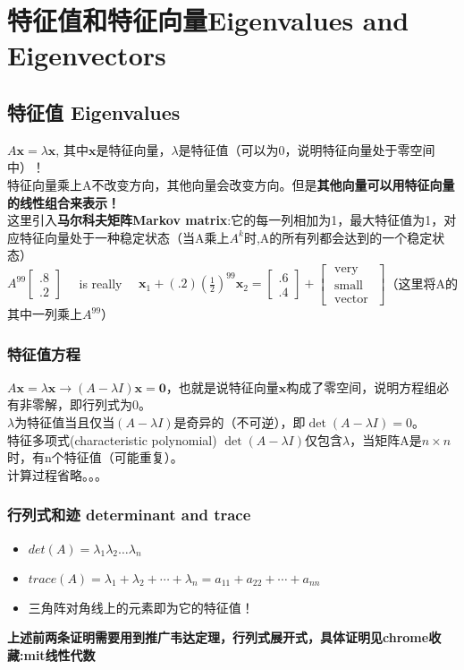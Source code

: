     \section{特征值和特征向量Eigenvalues and Eigenvectors}
    \subsection{特征值 Eigenvalues}
    $A \boldsymbol{x}=\lambda \boldsymbol{x}$, 其中$\bm{x}$是特征向量，$\lambda$是特征值（可以为0，说明特征向量处于零空间中）！
    \\
    特征向量乘上A不改变方向，其他向量会改变方向。但是\textbf{其他向量可以用特征向量的线性组合来表示！}
    \\
    这里引入\textbf{马尔科夫矩阵Markov matrix}:它的每一列相加为1，最大特征值为1，对应特征向量处于一种稳定状态（当A乘上$A^{k}$时,A的所有列都会达到的一个稳定状态）\\
    $A^{99}\left[\begin{array}{l}{.8} \\ {.2}\end{array}\right] \quad$ is really $\quad \boldsymbol{x}_{1}+(.2)\left(\frac{1}{2}\right)^{99} \boldsymbol{x}_{2}=\left[\begin{array}{l}{.6} \\ {.4}\end{array}\right]+\left[\begin{array}{l}{\text { very }} \\ {\text { small }} \\ {\text { vector }}\end{array}\right]$（这里将A的其中一列乘上$A^{99}$）
    \subsubsection{特征值方程}
    $A \boldsymbol{x}=\lambda \boldsymbol{x} \rightarrow (A-\lambda I) \bm{x}=\bm{0}$，也就是说特征向量$\bm{x}$构成了零空间，说明方程组必有非零解，即行列式为0。
    \\
    $\lambda$为特征值当且仅当$(A-\lambda I)$是奇异的（不可逆），即$\operatorname{det}(A-\lambda I)=0$。
    \\
    特征多项式(characteristic polynomial) $\operatorname{det}(A-\lambda I)$仅包含$\lambda$，当矩阵A是$n \times n$时，有n个特征值（可能重复）。
    \\
    计算过程省略。。。
    \subsubsection{行列式和迹 determinant and trace}
    \begin{itemize}
        \item $det(A)=\lambda_{1}\lambda_{2}\dots\lambda_{n}$
        \item $trace(A) = \lambda_{1}+\lambda_{2}+\cdots+\lambda_{n}=a_{11}+a_{22}+\cdots+a_{n n}$
        \item 三角阵对角线上的元素即为它的特征值！
    \end{itemize}
    \textbf{上述前两条证明需要用到推广韦达定理，行列式展开式，具体证明见chrome收藏:mit线性代数}
